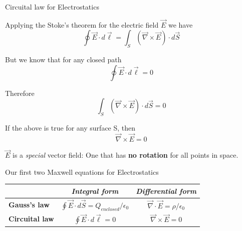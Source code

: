 \begin{frame}{Circuital law for Electrostatics}

Applying the Stoke's theorem for the electric field $\vec{E}$ we have
\begin{equation*}
    \oint \vec{E} \cdot d\vec{\ell} = \int_{S} (\vec{\nabla} \times \vec{E}) \cdot d\vec{S}
\end{equation*}

But we know that for any closed path
\begin{equation*}
    \oint \vec{E} \cdot d\vec{\ell} = 0
\end{equation*}

Therefore
\begin{equation*}
    \int_{S} (\vec{\nabla} \times \vec{E}) \cdot d\vec{S} = 0
\end{equation*}

If the above is true for any surface S, then
\begin{equation*}
    \vec{\nabla} \times \vec{E} = 0
\end{equation*}

$\vec{E}$ is a {\em special} vector field: One that has {\bf no rotation} for all points in space.

\end{frame}


%
%
%

\begin{frame}{Our first two Maxwell equations for Electrostatics}

\begin{center}
 {\Large
  \begin{table}[H]
    \begin{tabular}{|l|c|c|}
      \hline
          & {\it Integral form} & {\it Differential form} \\
      \hline
      {\bf Gauss's law} &
        $\oint \vec{E} \cdot d\vec{S} = Q_{enclosed} / \epsilon_0$ &
        $\vec{\nabla} \cdot \vec{E} = \rho / \epsilon_0$ \\

      {\bf Circuital law} &
        $\oint \vec{E} \cdot d\vec{\ell} = 0$ &
        $\vec{\nabla} \times \vec{E} = 0$ \\
      \hline
    \end{tabular}
  \end{table}
 }
\end{center}

\end{frame}


